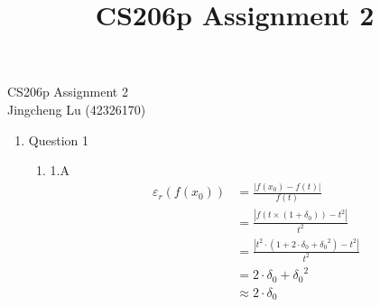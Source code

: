 \documentclass[12pt]{article}
\title{CS206p Assignment 2}
\begin{document}
CS206p Assignment 2\hfill  \\
Jingcheng Lu (42326170)

\hrulefill

\begin{enumerate}
\item Question 1
  \begin{enumerate}
  \item 1.A
  \begin{equation}
  \begin{split}
  \label{eq1.1}
{\varepsilon _r}(f({x_0})) &= \frac{{\left| {f({x_0}) - f(t)} \right|}}{{f(t)}} \\
&= \frac{{\left| {f(t \times (1 + {\delta _0})) - {t^2}} \right|}}{{{t^2}}} \\
&= \frac{{\left| {{t^2} \cdot (1 + 2 \cdot {\delta _0} + {\delta _0}^2) - {t^2}} \right|}}{{{t^2}}} \\
&= 2 \cdot {\delta _0} + {\delta _0}^2 \\
&\approx 2 \cdot {\delta _0}
  \end{split}
  \end{equation}
  

\end{enumerate}
\end{enumerate}
\end{document}
